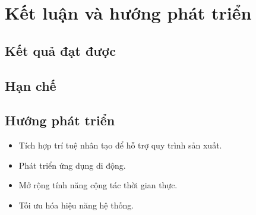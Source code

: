 
\chapter{Kết luận và hướng phát triển}
\label{chap:ket_luan}

\section{Kết quả đạt được}
\label{sec:ket_qua}



\section{Hạn chế}
\label{sec:han_che}



\section{Hướng phát triển}
\label{sec:huong_phat_trien}

\begin{itemize}
    \item Tích hợp trí tuệ nhân tạo để hỗ trợ quy trình sản xuất.
    \item Phát triển ứng dụng di động.
    \item Mở rộng tính năng cộng tác thời gian thực.
    \item Tối ưu hóa hiệu năng hệ thống.
\end{itemize}
